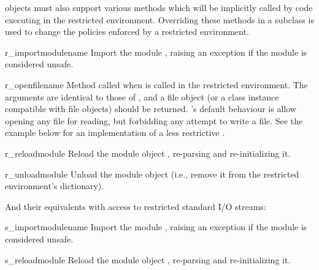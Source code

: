  objects must also support various methods which will be
implicitly called by code executing in the restricted environment.
Overriding these methods in a subclass is used to change the policies
enforced by a restricted environment.

\begin{methoddesc}{r_import}{modulename}
Import the module , raising an 
exception if the module is considered unsafe.
\end{methoddesc}

\begin{methoddesc}{r_open}{filename}
Method called when  is called in the restricted
environment.  The arguments are identical to those of ,
and a file object (or a class instance compatible with file objects)
should be returned.  's default behaviour is allow opening
any file for reading, but forbidding any attempt to write a file.  See
the example below for an implementation of a less restrictive
.
\end{methoddesc}

\begin{methoddesc}{r_reload}{module}
Reload the module object , re-parsing and re-initializing it.  
\end{methoddesc}

\begin{methoddesc}{r_unload}{module}
Unload the module object  (i.e., remove it from the
restricted environment's  dictionary).
\end{methoddesc}

And their equivalents with access to restricted standard I/O streams:

\begin{methoddesc}{s_import}{modulename}
Import the module , raising an 
exception if the module is considered unsafe.
\end{methoddesc}

\begin{methoddesc}{s_reload}{module}
Reload the module object , re-parsing and re-initializing it.  
\end{methoddesc}

